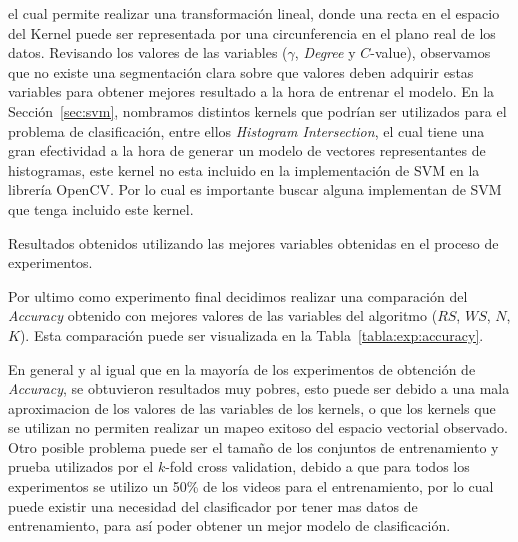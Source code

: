 el cual permite realizar una transformación lineal, donde una recta en el espacio del Kernel puede ser representada por una circunferencia en el plano real de los datos. Revisando los valores de las variables ($\gamma$, \textit{Degree} y $C$-value), observamos que no existe una segmentación clara sobre que valores deben adquirir estas variables para obtener mejores resultado a la hora de entrenar el modelo. En la Sección~\ref{sec:svm}, nombramos distintos kernels que podrían ser utilizados para el problema de clasificación, entre ellos \textit{Histogram Intersection}, el cual tiene una gran efectividad a la hora de generar un modelo de vectores representantes de histogramas, este kernel no esta incluido en la implementación de SVM en la librería OpenCV. Por lo cual es importante buscar alguna implementan de SVM que tenga incluido este kernel.

\begin{table}[tb]
	\centering
	\caption{Resultados obtenidos utilizando las mejores variables obtenidas en el proceso de experimentos.}
	\label{tabla:exp:accuracy}
\end{table}


Por ultimo como experimento final decidimos realizar una comparación del \textit{Accuracy} obtenido con mejores valores de las variables del algoritmo ($RS$, $WS$, $N$, $K$). Esta comparación puede ser visualizada en la Tabla~\ref{tabla:exp:accuracy}.

En general y al igual que en la mayoría de los experimentos de obtención de \textit{Accuracy}, se obtuvieron resultados muy pobres, esto puede ser debido a una mala aproximacion de los valores de las variables de los kernels, o que los kernels que se utilizan no permiten realizar un mapeo exitoso del espacio vectorial observado. Otro posible problema puede ser el tamaño de los conjuntos de entrenamiento y prueba utilizados por el $k$-fold cross validation, debido a que para todos los experimentos se utilizo un 50\% de los videos para el entrenamiento, por lo cual puede existir una necesidad del clasificador por tener mas datos de entrenamiento, para así poder obtener un mejor modelo de clasificación.
